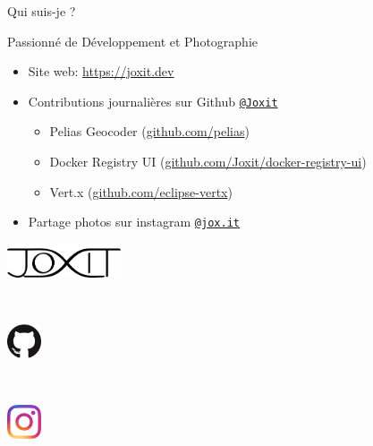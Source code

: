 \begin{frame}{Qui suis-je ?}

\begin{exampleblock}{Passionné de Développement et Photographie}
  \begin{itemize}
    \item Site web: \url{https://joxit.dev}
    \item Contributions journalières sur Github \href{https://github.com/Joxit}{\texttt{@Joxit}}
      \begin{itemize}
        \item Pelias Geocoder (\href{https://github.com/pelias/}{github.com/pelias})
        \item Docker Registry UI (\href{https://github.com/Joxit/docker-registry-ui}{github.com/Joxit/docker-registry-ui})
        \item Vert.x (\href{https://github.com/eclipse-vertx}{github.com/eclipse-vertx})
      \end{itemize}
    \item Partage photos sur instagram \href{https://instagram.com/jox.it}{\texttt{@jox.it}}
  \end{itemize}
  \begin{center}
    \begin{minipage}{0.33\textwidth}
      \centering \includegraphics[height=1cm,keepaspectratio]{images/joxit.png}
    \end{minipage}~
    \begin{minipage}{0.33\textwidth}
      \centering \includegraphics[height=1cm,keepaspectratio]{images/github.png}
    \end{minipage}~
    \begin{minipage}{0.33\textwidth}
      \centering \includegraphics[height=1cm,keepaspectratio]{images/instagram.png}
    \end{minipage}
  \end{center}
\end{exampleblock}

\end{frame}